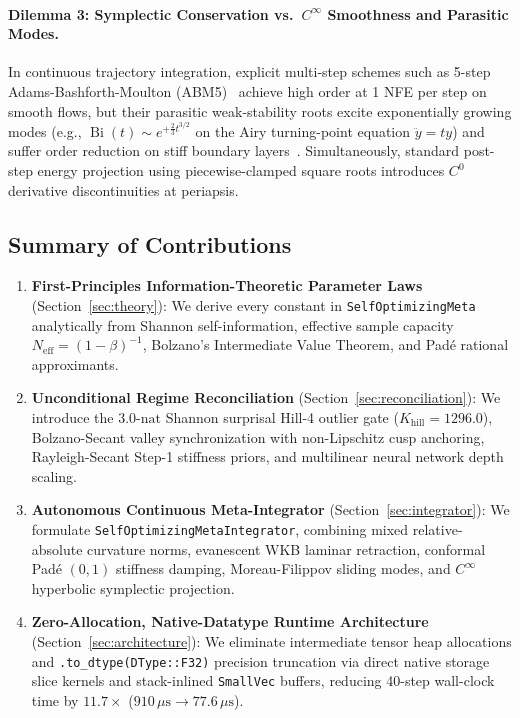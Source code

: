 \documentclass[10pt,twocolumn,letterpaper]{article}
\theoremstyle{definition}
\theoremstyle{remark}
\newcommand{\Bi}{\operatorname{Bi}}
\newcommand{\Neff}{N_{\mathrm{eff}}}
\begin{document}
\paragraph{Dilemma 3: Symplectic Conservation vs.\ $C^\infty$ Smoothness and Parasitic Modes.}
In continuous trajectory integration, explicit multi-step schemes such as 5-step Adams-Bashforth-Moulton (ABM5)~\cite{hairer1993solving1} achieve high order at 1 NFE per step on smooth flows, but their parasitic weak-stability roots excite exponentially growing modes (e.g., $\Bi(t) \sim e^{+\frac{2}{3}t^{3/2}}$ on the Airy turning-point equation $\ddot{y} = ty$) and suffer order reduction on stiff boundary layers~\cite{prothero1974stability}. Simultaneously, standard post-step energy projection using piecewise-clamped square roots introduces $C^0$ derivative discontinuities at periapsis.

\subsection{Summary of Contributions}
\begin{enumerate}[leftmargin=*,nosep]
  \item \textbf{First-Principles Information-Theoretic Parameter Laws} (Section~\ref{sec:theory}): We derive every constant in \texttt{SelfOptimizingMeta} analytically from Shannon self-information, effective sample capacity $\Neff = (1-\beta)^{-1}$, Bolzano's Intermediate Value Theorem, and Pad\'e rational approximants.
  \item \textbf{Unconditional Regime Reconciliation} (Section~\ref{sec:reconciliation}): We introduce the $3.0\text{-nat}$ Shannon surprisal Hill-4 outlier gate ($K_{\mathrm{hill}}=1296.0$), Bolzano-Secant valley synchronization with non-Lipschitz cusp anchoring, Rayleigh-Secant Step-1 stiffness priors, and multilinear neural network depth scaling.
  \item \textbf{Autonomous Continuous Meta-Integrator} (Section~\ref{sec:integrator}): We formulate \texttt{SelfOptimizingMetaIntegrator}, combining mixed relative-absolute curvature norms, evanescent WKB laminar retraction, conformal Pad\'e $(0,1)$ stiffness damping, Moreau-Filippov sliding modes, and $C^\infty$ hyperbolic symplectic projection.
  \item \textbf{Zero-Allocation, Native-Datatype Runtime Architecture} (Section~\ref{sec:architecture}): We eliminate intermediate tensor heap allocations and \texttt{.to\_dtype(DType::F32)} precision truncation via direct native storage slice kernels and stack-inlined \texttt{SmallVec} buffers, reducing 40-step wall-clock time by $11.7\times$ ($910\,\mu\mathrm{s} \to 77.6\,\mu\mathrm{s}$).
\end{enumerate}
\end{document}
